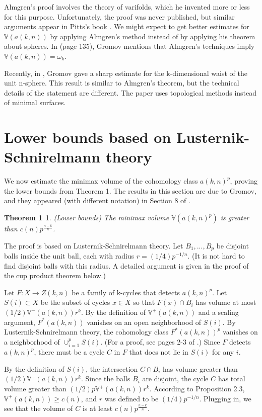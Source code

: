 \documentclass{amsart}
\newtheorem*{Theorem 1}{Theorem 1}
\newtheorem*{Theorem 2}{Theorem 2}
\newtheorem*{Theorem 1A}{Theorem 1A}
\newtheorem*{Theorem 2A}{Theorem 2A}
\newtheorem*{vanishing lemma}{Vanishing Lemma}
\numberwithin{equation}{section}
\begin{document}
Almgren's proof involves the theory of
varifolds, which he invented more or less for this purpose. 
Unfortunately, the proof was never published, but similar
arguments appear in Pitts's book \cite{P}.  We might expect to
get better estimates for $\mathbb{V}(a(k,n))$ by applying
Almgren's method instead of by applying his theorem about spheres.  In
\cite{G} (page 135), Gromov mentions that Almgren's
techniques imply $\mathbb{V}(a(k,n)) = \omega_k$.

Recently, in \cite{G3}, Gromov gave a sharp estimate for the
k-dimensional waist of the unit n-sphere.  This result is
similar to Almgren's theorem, but the technical details of the
statement are different.  The paper uses topological methods
instead of minimal surfaces.


\section{Lower bounds based on Lusternik-Schnirelmann theory}

We now estimate the minimax volume of the cohomology class $a(k,n)^p$,
proving the lower bounds from Theorem 1.  The results in this
section are due to Gromov, and they appeared (with different notation)
in Section 8 of \cite{G3}.

\begin{Theorem 1} (Lower bounds) The minimax volume
$\mathbb{V}(a(k,n)^p)$ is greater than $c(n) p^{\frac{n-k}{n}}$.
\end{Theorem 1}

\proof The proof is based on Lusternik-Schnirelmann theory.  Let
$B_1, ..., B_p$ be disjoint balls inside the unit ball, each with
radius $r = (1/4) p^{-1/n}$. (It is not hard to find disjoint
balls with this radius.  A detailed argument is given in the
proof of the cup product theorem below.)

Let $F: X \rightarrow Z(k,n)$ be a family of k-cycles that
detects $a(k,n)^p$.  Let $S(i) \subset X$ be the subset of cycles
$x \in X$ so that $F(x) \cap B_i$ has volume at most $(1/2)
\mathbb{V}^+(a(k,n)) r^k$.  By the definition of
$\mathbb{V}^+(a(k,n))$ and a scaling argument, $F^*(a(k,n))$
vanishes on an open neighborhood of $S(i)$.  By
Lusternik-Schnirelmann theory, the cohomology class
$F^*(a(k,n))^p$ vanishes on a neighborhood of $\cup_{i=1}^p
S(i)$.  (For a proof, see pages 2-3 of \cite{LS}.)  
Since $F$ detects $a(k,n)^p$, there must be a cycle $C$
in $F$ that does not lie in $S(i)$ for any $i$.

By the definition of $S(i)$, the intersection $C \cap B_i$ has
volume greater than $(1 / 2) \mathbb{V}^+(a(k,n)) r^k$. 
Since the balls $B_i$ are disjoint, the cycle $C$ has total
volume greater than $(1 / 2) p \mathbb{V}^+(a(k,n)) r^k$.  According to
Proposition 2.3, $\mathbb{V}^+(a(k,n)) \ge c(n)$, and $r$ was
defined to be $(1/4) p^{-1/n}$.  Plugging in, we see that the 
volume of $C$ is at least $c(n) p^{\frac{n-k}{n}}$. \endproof
\end{document}
